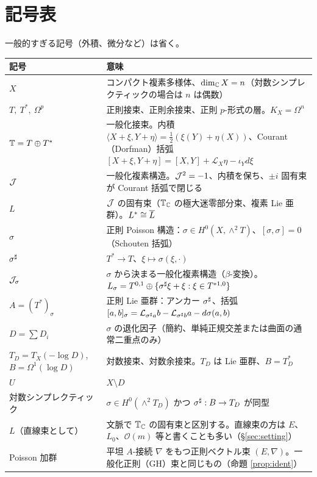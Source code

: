 \section{記号表}\label{sec:notation}
一般的すぎる記号（外積、微分など）は省く。

\begin{longtable}{>{\raggedright\arraybackslash}p{3.4cm}>{\raggedright\arraybackslash}p{11.6cm}}
\toprule 記号 & 意味\\ \midrule\endhead
$X$ & コンパクト複素多様体、$\dim_\mathbb C X=n$（対数シンプレクティックの場合は $n$ は偶数）\\
$T,\ T^*,\ \Omega^p$ & 正則接束、正則余接束、正則 $p$-形式の層。$K_X=\Omega^n$\\
$\mathbb T=T\oplus T^*$ & 一般化接束。内積 $\langle X+\xi,Y+\eta\rangle=\tfrac12(\xi(Y)+\eta(X))$、Courant（Dorfman）括弧 $[X+\xi,Y+\eta]=[X,Y]+\mathcal L_X\eta-\iota_Yd\xi$\\
$\mathcal J$ & 一般化複素構造。$\mathcal J^2=-1$、内積を保ち、$\pm i$ 固有束が Courant 括弧で閉じる\\
$L$ & $\mathcal J$ の固有束（$\mathbb T_\mathbb C$ の極大迷零部分束、複素 Lie 亜群）。$L^*\cong\overline L$\\
$\sigma$ & 正則 Poisson 構造：$\sigma\in H^0(X,\wedge^2T)$、$[\sigma,\sigma]=0$（Schouten 括弧）\\
$\sigma^\sharp$ & $T^*\to T$、$\xi\mapsto\sigma(\xi,\cdot)$\\
$\mathcal J_\sigma$ & $\sigma$ から決まる一般化複素構造（$\beta$-変換）。$L_\sigma=T^{0,1}\oplus\{\sigma^\sharp\xi+\xi:\xi\in T^{*1,0}\}$\\
$A=(T^*)_\sigma$ & 正則 Lie 亜群：アンカー $\sigma^\sharp$、括弧 $[a,b]_\sigma=\mathcal L_{\sigma^\sharp a}b-\mathcal L_{\sigma^\sharp b}a-d\sigma(a,b)$\\
$D=\sum D_i$ & $\sigma$ の退化因子（簡約、単純正規交差または曲面の通常二重点のみ）\\
$T_D=T_X(-\log D)$,\ $B=\Omega^1(\log D)$ & 対数接束、対数余接束。$T_D$ は Lie 亜群、$B=T_D^*$\\
$U$ & $X\setminus D$\\
対数シンプレクティック & $\sigma\in H^0(\wedge^2T_D)$ かつ $\sigma^\sharp:B\to T_D$ が同型\\
$L$（直線束として）& 文脈で $\mathbb T_\mathbb C$ の固有束と区別する。直線束の方は $E$、$L_0$、$\mathcal O(m)$ 等と書くことも多い（\S\ref{sec:setting}）\\
Poisson 加群 & 平坦 $A$-接続 $\nabla$ をもつ正則ベクトル束 $(E,\nabla)$。一般化正則（GH）束と同じもの（命題 \ref{prop:ident}）\\

\end{longtable}
